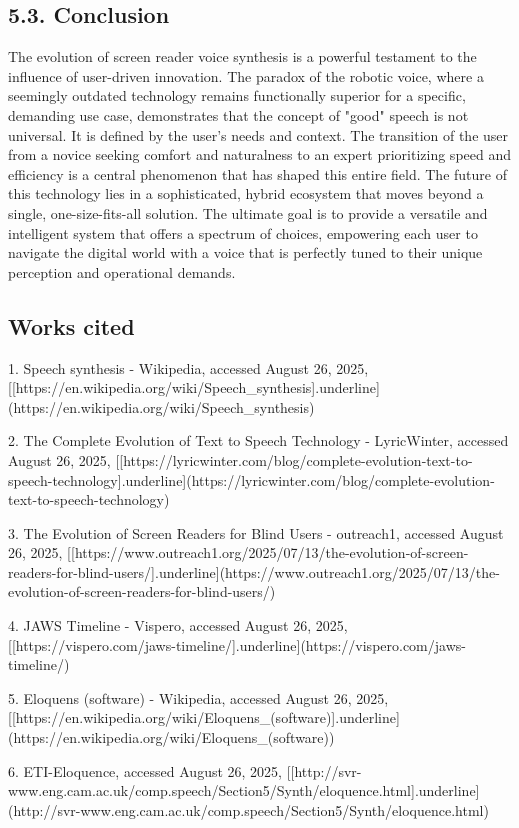 \subsection{5.3. Conclusion}
The evolution of screen reader voice synthesis is a powerful testament
to the influence of user-driven innovation. The paradox of the robotic
voice, where a seemingly outdated technology remains functionally
superior for a specific, demanding use case, demonstrates that the
concept of "good" speech is not universal. It is defined by the
user's needs and context. The transition of the user from a novice
seeking comfort and naturalness to an expert prioritizing speed and
efficiency is a central phenomenon that has shaped this entire field.
The future of this technology lies in a sophisticated, hybrid ecosystem
that moves beyond a single, one-size-fits-all solution. The ultimate
goal is to provide a versatile and intelligent system that offers a
spectrum of choices, empowering each user to navigate the digital world
with a voice that is perfectly tuned to their unique perception and
operational demands.

\subsection{Works cited}
1.  Speech synthesis - Wikipedia, accessed August 26, 2025,
    [[https://en.wikipedia.org/wiki/Speech_synthesis]{.underline}](https://en.wikipedia.org/wiki/Speech_synthesis)

2.  The Complete Evolution of Text to Speech Technology - LyricWinter,
    accessed August 26, 2025,
    [[https://lyricwinter.com/blog/complete-evolution-text-to-speech-technology]{.underline}](https://lyricwinter.com/blog/complete-evolution-text-to-speech-technology)

3.  The Evolution of Screen Readers for Blind Users - outreach1,
    accessed August 26, 2025,
    [[https://www.outreach1.org/2025/07/13/the-evolution-of-screen-readers-for-blind-users/]{.underline}](https://www.outreach1.org/2025/07/13/the-evolution-of-screen-readers-for-blind-users/)

4.  JAWS Timeline - Vispero, accessed August 26, 2025,
    [[https://vispero.com/jaws-timeline/]{.underline}](https://vispero.com/jaws-timeline/)

5.  Eloquens (software) - Wikipedia, accessed August 26, 2025,
    [[https://en.wikipedia.org/wiki/Eloquens\_(software)]{.underline}](https://en.wikipedia.org/wiki/Eloquens_(software))

6.  ETI-Eloquence, accessed August 26, 2025,
    [[http://svr-www.eng.cam.ac.uk/comp.speech/Section5/Synth/eloquence.html]{.underline}](http://svr-www.eng.cam.ac.uk/comp.speech/Section5/Synth/eloquence.html)

